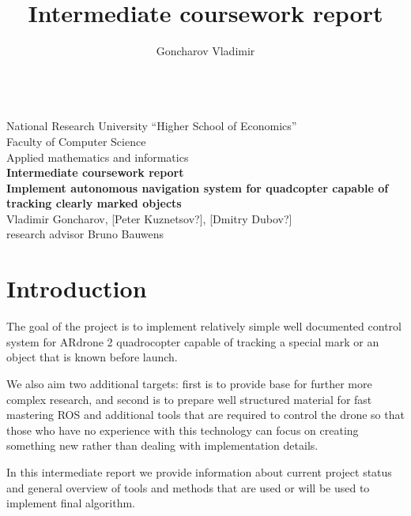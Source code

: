 \documentclass[11pt]{article}
\begin{document}
    \setcounter{page}{0}

    \title{\textbf{Intermediate coursework report}}
    \author{Goncharov Vladimir}

    \thispagestyle{empty}

    \begin{center}
    ~\\[10ex]
    {National Research University ``Higher School of Economics''}\\
    Faculty of Computer Science\\
    Applied mathematics and informatics\\[15.0ex]
    {\LARGE\bf Intermediate coursework report}\\[4.0ex]
    {\Large\bf Implement autonomous navigation system for quadcopter capable of tracking clearly marked objects}\\[4.0ex]
    Vladimir Goncharov, [Peter Kuznetsov?], [Dmitry Dubov?]\\
    research advisor Bruno Bauwens\\[4.0ex]
    \end{center}

    \newpage


    \tableofcontents

    \newpage

    \section{Introduction}

    The goal of the project is to implement relatively simple
    well documented control system for ARdrone 2 quadrocopter
    capable of tracking a special mark or an object that is known before launch.

    We also aim two additional targets: first is to provide base for further
    more complex research, and second is to prepare well structured material
    for fast mastering ROS and additional tools that are required to control
    the drone so that those who have no experience with this technology
    can focus on creating something new rather than dealing with
    implementation details.

    In this intermediate report we provide information about current project
    status and general overview of tools and methods
    that are used or will be used to implement final algorithm.
\end{document}
